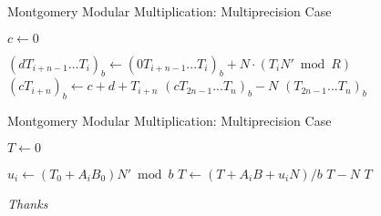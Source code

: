 \documentclass{beamer}
\begin{document}
\begin{frame}{Montgomery Modular Multiplication: Multiprecision Case}
	\begin{algorithmic}

		\STATE $c \gets 0$

			\STATE $(dT_{i+n-1}...T_i)_b \gets (0T_{i+n-1}...T_i)_b+N\cdot (T_i N' \bmod R)$
			\STATE $(cT_{i+n})_b \gets c + d + T_{i+n}$
		\ENDFOR
			\RETURN $(cT_{2n-1}...T_n)_b - N$
		\ELSE
			\RETURN $(T_{2n-1}...T_n)_b$
		\ENDIF
\end{algorithmic}
\end{frame}

\begin{frame}{Montgomery Modular Multiplication: Multiprecision Case}
	\begin{algorithmic}

		\STATE $T \gets 0$

		\STATE $u_i \gets (T_0 + A_iB_0)N' \bmod b$
		\STATE $T \gets (T+A_iB+u_iN)/b$
		\ENDFOR
		\RETURN $T-N$
		\ELSE
		\RETURN $T$
		\ENDIF
	\end{algorithmic}
\end{frame}


\begin{frame}{}
  \centering \Large
	\emph{Thanks}
\end{frame}
\end{document}
